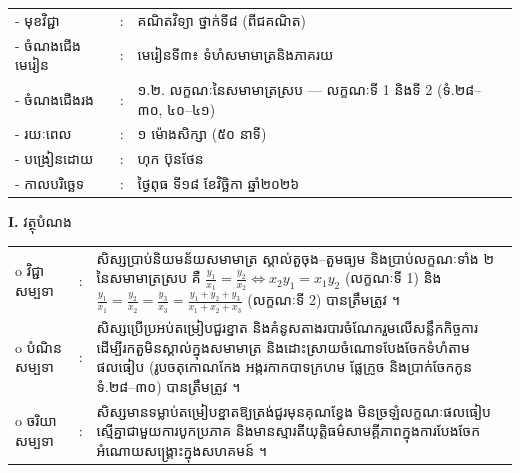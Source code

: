 \documentclass[a4paper,10pt]{article}
\newcommand{\wcirc}{{\CourierBullet\fontsize{9.5pt}{11pt}\selectfont o}}
\begin{document}
{\renewcommand{\arraystretch}{0.98}
\hspace*{3.1cm}%
\begin{tabular}{@{}l l L{11.0cm}@{}}
  - \hspace{0.35cm} មុខវិជ្ជា & : & គណិតវិទ្យា ថ្នាក់ទី៨ (ពីជគណិត) \\
  - \hspace{0.35cm} ចំណងជើងមេរៀន & : & មេរៀនទី៣៖ ទំហំសមាមាត្រនិងភាគរយ \\
  - \hspace{0.35cm} ចំណងជើងរង & : & ១.២. លក្ខណៈនៃសមាមាត្រស្រប — លក្ខណៈទី 1 និងទី 2 (ទំ.២៨–៣០, ៤០–៤១) \\
  - \hspace{0.35cm} រយៈពេល & : & ១ ម៉ោងសិក្សា (៥០ នាទី) \\
  - \hspace{0.35cm} បង្រៀនដោយ & : & ហុក ប៊ុនថែន \\
  - \hspace{0.35cm} កាលបរិច្ឆេទ & : & ថ្ងៃពុធ ទី១៨ ខែវិច្ឆិកា ឆ្នាំ២០២៦ \\
\end{tabular}

\vspace{2pt}

\textbf{I.} {\muol វត្ថុបំណង}\\[1pt]
\hspace*{0.55cm}%
\begin{tabular}{@{}l l L{14.2cm}@{}}
  \wcirc \hspace{0.25cm} វិជ្ជាសម្បទា & : & សិស្សប្រាប់និយមន័យសមាមាត្រ ស្គាល់តួចុង–តួមធ្យម និងប្រាប់លក្ខណៈទាំង ២ នៃសមាមាត្រស្រប គឺ $\frac{y_1}{x_1}=\frac{y_2}{x_2} \iff x_2 y_1 = x_1 y_2$ (លក្ខណៈទី 1) និង $\frac{y_1}{x_1}=\frac{y_2}{x_2}=\frac{y_3}{x_3}=\frac{y_1+y_2+y_3}{x_1+x_2+x_3}$ (លក្ខណៈទី 2) បានត្រឹមត្រូវ ។ \\
  \wcirc \hspace{0.25cm} បំណិនសម្បទា & : & សិស្សប្រើប្រអប់តម្រៀបជួរខ្នាត និងគំនូសតាងរបារចំណែករួមលើសន្លឹកកិច្ចការ ដើម្បីរកតួមិនស្គាល់ក្នុងសមាមាត្រ និងដោះស្រាយចំណោទបែងចែកទំហំតាមផលធៀប (រូបចតុកោណកែង អង្ករកាកបាទក្រហម ផ្លែក្រូច និងប្រាក់ចែកកូន ទំ.២៨–៣០) បានត្រឹមត្រូវ ។ \\
  \wcirc \hspace{0.25cm} ចរិយាសម្បទា & : & សិស្សមានទម្លាប់តម្រៀបខ្នាតឱ្យត្រង់ជួរមុនគុណខ្វែង មិនច្រឡំលក្ខណៈផលធៀបស្មើគ្នាជាមួយការបូកប្រភាគ និងមានស្មារតីយុត្តិធម៌សាមគ្គីភាពក្នុងការបែងចែកអំណោយសង្គ្រោះក្នុងសហគមន៍ ។ \\
\end{tabular}

}
\end{document}
